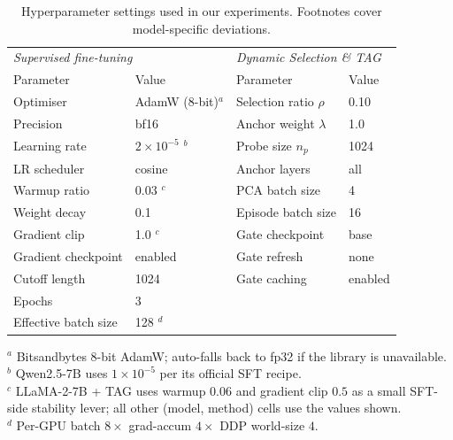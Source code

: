 \begin{table}[h]
\centering
\caption{Hyperparameter settings used in our experiments.
Footnotes cover model-specific deviations.}
\label{tab:hyperparams}
\small
\setlength{\tabcolsep}{4pt}
\begin{tabular}{ll@{\hspace{1em}}ll}
\toprule
\multicolumn{2}{l}{\emph{Supervised fine-tuning}} &
\multicolumn{2}{l}{\emph{Dynamic Selection \& TAG}} \\
Parameter & Value & Parameter & Value \\
\midrule
Optimiser            & AdamW (8-bit)$^{a}$        & Selection ratio $\rho$  & 0.10 \\
Precision            & bf16                       & Anchor weight $\lambda$ & 1.0  \\
Learning rate        & $2\times10^{-5}$ $^{b}$   & Probe size $n_p$        & 1024 \\
LR scheduler         & cosine                     & Anchor layers           & all  \\
Warmup ratio         & 0.03 $^{c}$                & PCA batch size          & 4    \\
Weight decay         & 0.1                        & Episode batch size      & 16   \\
Gradient clip        & 1.0 $^{c}$                 & Gate checkpoint         & base \\
Gradient checkpoint  & enabled                    & Gate refresh            & none \\
Cutoff length        & 1024                       & Gate caching            & enabled \\
Epochs               & 3                          &                         &      \\
Effective batch size & 128 $^{d}$                 &                         &      \\
\bottomrule
\end{tabular}

\smallskip
\begin{flushleft}
\tiny
$^{a}$ Bitsandbytes 8-bit AdamW; auto-falls back to fp32 if the library is unavailable.\\
$^{b}$ Qwen2.5-7B uses $1\times10^{-5}$ per its official SFT recipe.\\
$^{c}$ LLaMA-2-7B + TAG uses warmup $0.06$ and gradient clip $0.5$ as a small SFT-side stability lever; all other (model, method) cells use the values shown.\\
$^{d}$ Per-GPU batch $8\times$ grad-accum $4\times$ DDP world-size $4$.
\end{flushleft}
\end{table}


